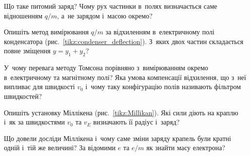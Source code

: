 \begin{Questions}
\begin{quizlist}
	\item Що таке питомий заряд? Чому рух частинки в~полях визначається саме відношенням $q/m$, а~не зарядом і~масою окремо?
	\item Опишіть метод вимірювання $q/m$ за відхиленням в~електричному полі конденсатора (рис.~\ref{tikz:condenser_deflection}). З~яких двох частин складається повне зміщення $y = y_1 + y_2$?
	\item У~чому перевага методу Томсона порівняно з~вимірюванням окремо в~електричному та магнітному полі? Яка умова компенсації відхилення, що з~неї випливає для швидкості $v_0$ і~чому таку конфігурацію полів називають фільтром швидкостей?
	\item Опишіть установку Міллікена (рис.~\ref{tikz:Millikan}). Які сили діють на краплю і~як за швидкостями $v_0$ та $v_E$ визначають її радіус і~заряд?
	\item Що довели досліди Міллікена і~чому саме зміни заряду крапель були кратні одній і~тій же величині? За відомими $e$ та $e/m$ як знайти масу електрона?
\end{quizlist}
\end{Questions}

